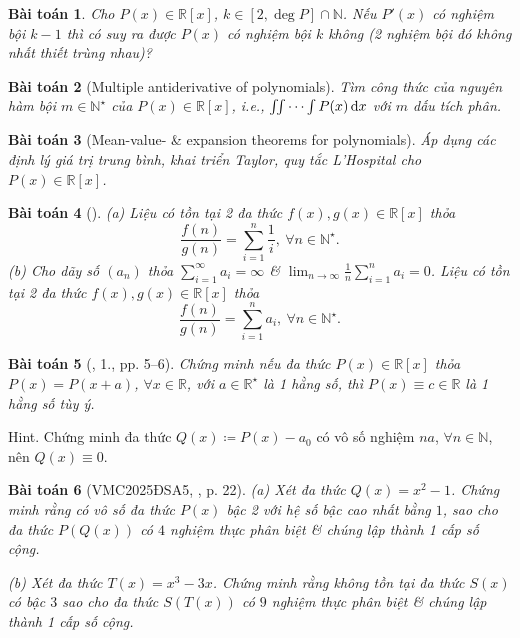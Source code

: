\documentclass{article}
\newtheorem{baitoan}{Bài toán}
\begin{document}
\begin{baitoan}
	Cho $P(x)\in\mathbb{R}[x]$, $k\in[2,\deg P]\cap\mathbb{N}$. Nếu $P'(x)$ có nghiệm bội $k - 1$ thì có suy ra được $P(x)$ có nghiệm bội $k$ không (2 nghiệm bội đó không nhất thiết trùng nhau)?
\end{baitoan}

\begin{baitoan}[Multiple antiderivative of polynomials]
	Tìm công thức của nguyên hàm bội $m\in\mathbb{N}^\star$ của $P(x)\in\mathbb{R}[x]$, i.e., $\iint\cdots\int P(x)\,{\rm d}x$ với $m$ dấu tích phân.
\end{baitoan}

\begin{baitoan}[Mean-value- \& expansion theorems for polynomials]
	Áp dụng các định lý giá trị trung bình, khai triển Taylor, quy tắc L'Hospital cho $P(x)\in\mathbb{R}[x]$.
\end{baitoan}

\begin{baitoan}[\cite{Quoc_Long_Dat_Nam_VMC}]
	(a) Liệu có tồn tại 2 đa thức $f(x),g(x)\in\mathbb{R}[x]$ thỏa
	\begin{equation*}
		\frac{f(n)}{g(n)} = \sum_{i=1}^n \frac{1}{i},\ \forall n\in\mathbb{N}^\star.
	\end{equation*}
	(b) Cho dãy số $(a_n)$ thỏa $\sum_{i=1}^\infty a_i = \infty$ \& $\lim_{n\to\infty} \frac{1}{n}\sum_{i=1}^n a_i = 0$. Liệu có tồn tại 2 đa thức $f(x),g(x)\in\mathbb{R}[x]$ thỏa
	\begin{equation*}
		\frac{f(n)}{g(n)} = \sum_{i=1}^n a_i,\ \forall n\in\mathbb{N}^\star.
	\end{equation*}
\end{baitoan}

\begin{baitoan}[\cite{Chung_pth_da_thuc}, 1., pp. 5--6]
	Chứng minh nếu đa thức $P(x)\in\mathbb{R}[x]$ thỏa $P(x) = P(x + a)$, $\forall x\in\mathbb{R}$, với $a\in\mathbb{R}^\star$ là 1 hằng số, thì $P(x)\equiv c\in\mathbb{R}$ là 1 hằng số tùy ý.
\end{baitoan}
{\sf Hint.} Chứng minh đa thức $Q(x)\coloneqq P(x) - a_0$ có vô số nghiệm $na$, $\forall n\in\mathbb{N}$, nên $Q(x)\equiv0$.


\begin{baitoan}[VMC2025ĐSA5, \cite{VMS_VMC2025}, p. 22]
	\item(a) Xét đa thức $Q(x) = x^2 - 1$. Chứng minh rằng có vô số đa thức $P(x)$ bậc 2 với hệ số bậc cao nhất bằng $1$, sao cho đa thức $P(Q(x))$ có $4$ nghiệm thực phân biệt \& chúng lập thành 1 cấp số cộng.
	\item(b) Xét đa thức $T(x) = x^3 - 3x$. Chứng minh rằng không tồn tại đa thức $S(x)$ có bậc $3$ sao cho đa thức $S(T(x))$ có $9$ nghiệm thực phân biệt \& chúng lập thành 1 cấp số cộng.
\end{baitoan}
\end{document}
